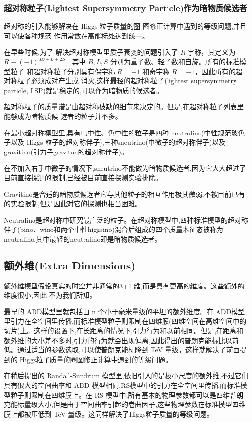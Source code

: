 \subsubsection{超对称粒子(Lightest Supersymmetry Particle)作为暗物质候选者}

超对称的引入能够解决在 Higgs 粒子质量的圈
图修正计算中遇到的等级问题,并且可以使各种规范
作用常数在高能标处达到统一。

在早些时候,为了
解决超对称模型里质子衰变的问题引入了 $R$ 宇称，其定义为 $R\equiv (-1)^{3B+L+2S}$，其中 $B,L,S$ 分别为重子数、轻子数和自旋。所有的标准模型粒子
和超对称粒子分别具有偶宇称 $R=+1$ 和奇宇称 $R=-1$，因此所有的超对称粒子必须成对产生或
消灭,这样最轻的超对称粒子(lightest supersymmetry particle, LSP)就是稳定的,可以作为暗物质的候选者。

超对称粒子的质量谱是由超对称破缺的细节来决定的。但是,在超对称粒子列表里能够成为暗物质候
选者的粒子并不多。

在最小超对称模型里,具有电中性、色中性的粒子是四种 neutralino(中性规范玻色子以及 Higgs 粒子的超对称伴子),三种sneutrino(中微子的超对称伴子)以及 gravitino(引力子graviton的超对称伴子)。

在不加入右手中微子的情况下,sneutrino不能做为暗物质候选者,因为它大大超过了目前直接探测的限制,已经被目前直接探测实验排除。

Gravitino是合适的暗物质候选者它与其他粒子的相互作用极其微弱,不被目前已有的实验限制,但是因此对它的探测也相当困难。

Neutralino是超对称中研究最广泛的粒子。在超对称模型中,四种标准模型的超对称伴子(bino、wino和两个中性higgsino)混合后组成的四个质量本征态被称为neutralino,其中最轻的neutralino即是暗物质候选者。

\subsection{额外维(Extra Dimensions)}

额外维模型假设真实的时空并非通常的3+1
维,而是具有更高的维度。这些额外的维度很小,因此
不为我们所知。

最早的 ADD模型里就包括由 n 个小于毫米量级的平坦的额外维度。在 ADD模型里引力在全空间里传播,而标准模型粒子则限制在四维膜(四维空间在高维空间中的切片)上。这样的设置下,在长距离的情况下,引力行为和以前相同。但是,在距离和额外维的大小差不多时,引力的行为就会出现偏离,因此得出的普朗克能标比以前低。通过适当的参数选取,可以使普朗克能标降到 TeV 量级，这样就解决了前面提到的 Higgs粒子质量的圈图修正计算中遇到的等级问题。

在稍后提出的 Randall-Sundrum 模型里,依旧引入的是极小尺度的额外维,不过它们具有很大的空间曲率和 ADD 模型相同,RS模型中的引力在全空间里传播,而标准模型粒子则限制在四维膜上。在 RS 模型中,所有基本的物理参数都可以是四维普朗克能标量级大小,但是由于空间曲率引起的卷曲因子,这些物理参数在标准模型四维膜上都被压低到 TeV 量级。这同样解决了Higgs粒子质量的等级问题。

